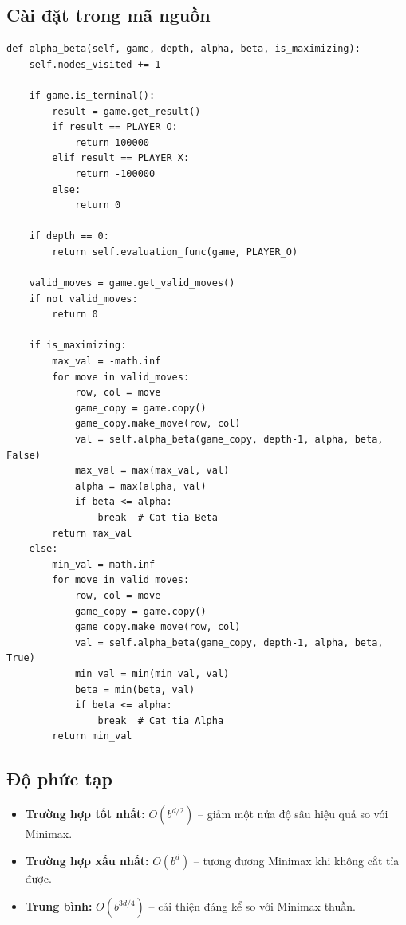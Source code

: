 \documentclass[12pt,a4paper]{article}
\begin{document}
\subsection{Cài đặt trong mã nguồn}

\begin{lstlisting}[caption={Cài đặt Alpha-Beta Pruning (\texttt{ai\_agent.py})}]
def alpha_beta(self, game, depth, alpha, beta, is_maximizing):
    self.nodes_visited += 1

    if game.is_terminal():
        result = game.get_result()
        if result == PLAYER_O:
            return 100000
        elif result == PLAYER_X:
            return -100000
        else:
            return 0

    if depth == 0:
        return self.evaluation_func(game, PLAYER_O)

    valid_moves = game.get_valid_moves()
    if not valid_moves:
        return 0

    if is_maximizing:
        max_val = -math.inf
        for move in valid_moves:
            row, col = move
            game_copy = game.copy()
            game_copy.make_move(row, col)
            val = self.alpha_beta(game_copy, depth-1, alpha, beta, False)
            max_val = max(max_val, val)
            alpha = max(alpha, val)
            if beta <= alpha:
                break  # Cat tia Beta
        return max_val
    else:
        min_val = math.inf
        for move in valid_moves:
            row, col = move
            game_copy = game.copy()
            game_copy.make_move(row, col)
            val = self.alpha_beta(game_copy, depth-1, alpha, beta, True)
            min_val = min(min_val, val)
            beta = min(beta, val)
            if beta <= alpha:
                break  # Cat tia Alpha
        return min_val
\end{lstlisting}

\subsection{Độ phức tạp}

\begin{itemize}
    \item \textbf{Trường hợp tốt nhất:} $O(b^{d/2})$ -- giảm một nửa độ sâu hiệu quả so với Minimax.
    \item \textbf{Trường hợp xấu nhất:} $O(b^d)$ -- tương đương Minimax khi không cắt tỉa được.
    \item \textbf{Trung bình:} $O(b^{3d/4})$ -- cải thiện đáng kể so với Minimax thuần.
\end{itemize}
\end{document}
